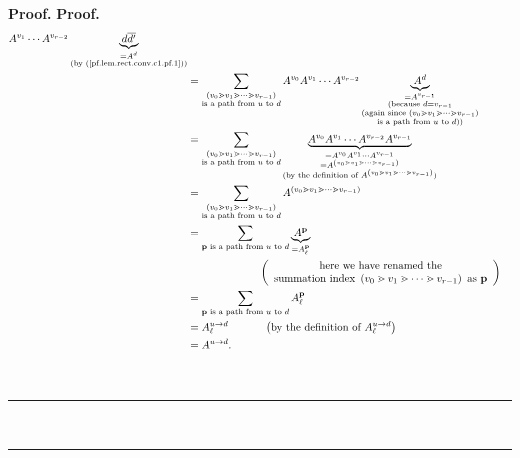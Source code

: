 \documentclass[numbers=enddot,12pt,final,onecolumn,notitlepage]{scrartcl}%
\theoremstyle{definition}
\newenvironment{verlong}{}{}
\newcommand{\downslack}{A}
\newenvironment{proof}[1][Proof]{\noindent\textbf{#1.} }{\ \rule{0.5em}{0.5em}}
\let\sumnonlimits\sum
\renewcommand{\sum}{\sumnonlimits\limits}
\begin{document}
\begin{proof}
\begin{proof}
\begin{verlong}
\begin{align*}
{}\downslack^{v_{1}}\cdots\downslack^{v_{r-2}}\underbrace{d\overline{d^{\prime
}}}_{\substack{=\downslack^{d}\\\text{(by (\ref{pf.lem.rect.conv.c1.pf.1}))}%
}}\\
&  =\sum_{\substack{\left(  v_{0}\gtrdot v_{1}\gtrdot\cdots\gtrdot
v_{r-1}\right)  \\\text{is a path from }u\text{ to }d}}\downslack^{v_{0}%
}\downslack^{v_{1}}\cdots\downslack^{v_{r-2}}\underbrace{\downslack^{d}%
}_{\substack{=\downslack^{v_{r-1}}\\\text{(because }d=v_{r-1}\\\text{(again
since }\left(  v_{0}\gtrdot v_{1}\gtrdot\cdots\gtrdot v_{r-1}\right)
\\\text{is a path from }u\text{ to }d\text{))}}}\\
&  =\sum_{\substack{\left(  v_{0}\gtrdot v_{1}\gtrdot\cdots\gtrdot
v_{r-1}\right)  \\\text{is a path from }u\text{ to }d}%
}\underbrace{\downslack^{v_{0}}\downslack^{v_{1}}\cdots\downslack^{v_{r-2}%
}\downslack^{v_{r-1}}}_{\substack{=\downslack^{v_{0}}\downslack^{v_{1}}%
\cdots\downslack^{v_{r-1}}\\=\downslack^{\left(  v_{0}\gtrdot v_{1}%
\gtrdot\cdots\gtrdot v_{r-1}\right)  }\\\text{(by the definition of
}\downslack^{\left(  v_{0}\gtrdot v_{1}\gtrdot\cdots\gtrdot v_{r-1}\right)
}\text{)}}}\\
&  =\sum_{\substack{\left(  v_{0}\gtrdot v_{1}\gtrdot\cdots\gtrdot
v_{r-1}\right)  \\\text{is a path from }u\text{ to }d}}\downslack^{\left(
v_{0}\gtrdot v_{1}\gtrdot\cdots\gtrdot v_{r-1}\right)  }\\
&  =\sum_{\mathbf{p}\text{ is a path from }u\text{ to }d}%
\underbrace{\downslack^{\mathbf{p}}}_{=\downslack_{\ell}^{\mathbf{p}}}\\
&  \ \ \ \ \ \ \ \ \ \ \ \ \ \ \ \ \ \ \ \ \left(
\begin{array}
[c]{c}%
\text{here we have renamed the}\\
\text{summation index }\left(  v_{0}\gtrdot v_{1}\gtrdot\cdots\gtrdot
v_{r-1}\right)  \text{ as }\mathbf{p}%
\end{array}
\right) \\
&  =\sum_{\mathbf{p}\text{ is a path from }u\text{ to }d}\downslack_{\ell
}^{\mathbf{p}}\\
&  =\downslack_{\ell}^{u\rightarrow d}\ \ \ \ \ \ \ \ \ \ \left(  \text{by the
definition of }\downslack_{\ell}^{u\rightarrow d}\right) \\
&  =\downslack^{u\rightarrow d}.
\end{align*}


\end{verlong}
\end{proof}
\end{proof}
\end{document}
